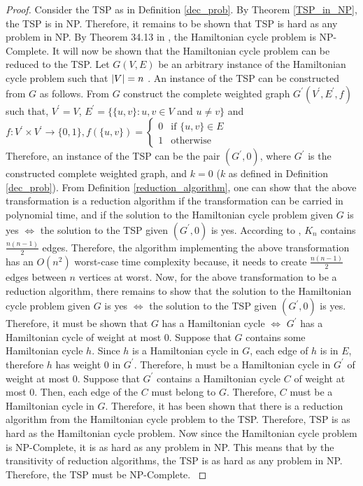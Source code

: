 \documentclass[12pt]{article}
\numberwithin{equation}{subsection}
\numberwithin{table}{subsection}
\numberwithin{algorithm}{subsection}
\numberwithin{figure}{subsection}
\begin{document}
\begin{proof}
Consider the TSP as in Definition \ref{dec_prob}. By Theorem \ref{TSP_in_NP}, the TSP is in NP. Therefore, it remains to be shown that TSP is hard as any problem in NP. By Theorem 34.13 in \cite{cormen_leiserson_rivest_stein}, the Hamiltonian cycle problem is NP-Complete. It will now be shown that the Hamiltonian cycle problem can be reduced to the TSP. Let $G(V,E)$ be an arbitrary instance of the Hamiltonian cycle problem such that $\abs{V} = n$ . An instance of the TSP can be constructed from $G$ as follows. From $G$ construct the complete weighted graph $G^\prime(V^\prime,E^\prime,f)$ such that, $V^\prime=V$, $E^\prime=\{\{u, v\} : u, v \in V$ and $u \neq v\}$ and \\
$f\colon V^\prime \times V^\prime \to \{0,1\}, f(\{u, v\}) = \begin{cases} 0& \text{if } \{u, v\} \in E\\ 1              & \text{otherwise} \end{cases}$\\
Therefore, an instance of the TSP can be the pair $(G^\prime,0)$, where $G^\prime$ is the constructed complete weighted graph, and $k =0$ ($k$ as defined in Definition \ref{dec_prob}). From Definition \ref{reduction_algorithm}, one can show that the above transformation is a reduction algorithm if the transformation can be carried in polynomial time, and if the solution to the Hamiltonian cycle problem given $G$ is yes $\iff$ the solution to the TSP given $(G^\prime,0)$ is yes. According to \cite{ray_2013}, $K_n$ contains $\frac{n(n-1)}{2}$ edges. Therefore, the algorithm implementing the above transformation has an $O(n^2)$ worst-case time complexity because, it needs to create $\frac{n(n-1)}{2}$ edges between $n$ vertices at worst. Now, for the above transformation to be a reduction algorithm, there remains to show that the solution to the Hamiltonian cycle problem given $G$ is yes $\iff$ the solution to the TSP given $(G^\prime,0)$ is yes. Therefore, it must be shown that $G$ has a Hamiltonian cycle $\iff$ $G^\prime$ has a Hamiltonian cycle of weight at most 0. Suppose that $G$ contains some Hamiltonian cycle $h$. Since $h$ is a Hamiltonian cycle in $G$, each edge of $h$ is in $E$, therefore $h$ has weight 0 in $G^\prime$. Therefore, h must be a Hamiltonian cycle in $G^\prime$ of weight at most 0. Suppose that $G^\prime$ contains a Hamiltonian cycle $C$ of weight at most 0. Then, each edge of the $C$ must belong to $G$. Therefore, $C$ must be a Hamiltonian cycle in $G$. Therefore, it has been shown that there is a reduction algorithm from the Hamiltonian cycle problem to the TSP. Therefore, TSP is as hard as the Hamiltonian cycle problem. Now since the Hamiltonian cycle problem is NP-Complete, it is as hard as any problem in NP. This means that by the transitivity of reduction algorithms, the TSP is as hard as any problem in NP. Therefore, the TSP must be NP-Complete. \cite{cormen_leiserson_rivest_stein}
\end{proof}
\end{document}
